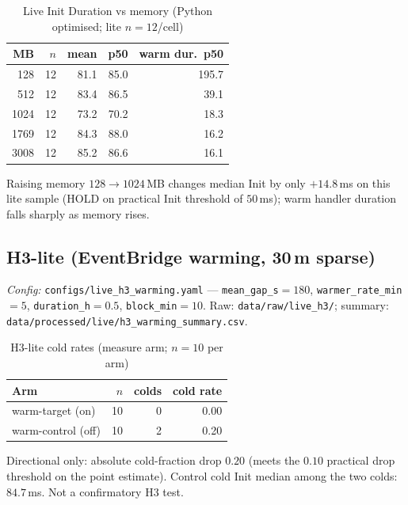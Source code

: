\begin{table}[h]
\centering
\caption{Live Init Duration vs memory (Python optimised; lite $n{=}12$/cell)}
\label{tab:eval_live_h4}
\begin{tabular}{rrrrr}
\hline
\textbf{MB} & \textbf{$n$} & \textbf{mean} & \textbf{p50} & \textbf{warm dur.\ p50} \\
\hline
128 & 12 & 81.1 & 85.0 & 195.7 \\
512 & 12 & 83.4 & 86.5 & 39.1 \\
1024 & 12 & 73.2 & 70.2 & 18.3 \\
1769 & 12 & 84.3 & 88.0 & 16.2 \\
3008 & 12 & 85.2 & 86.6 & 16.1 \\
\hline
\end{tabular}
\end{table}

Raising memory $128{\rightarrow}1024$\,MB changes median Init by only $+14.8$\,ms on this
lite sample (HOLD on practical Init threshold of $50$\,ms); warm handler duration falls
sharply as memory rises.

\subsection{H3-lite (EventBridge warming, 30\,m sparse)}

\textit{Config:} \texttt{configs/live_h3_warming.yaml} --- \texttt{mean\_gap\_s}${}={}180$,
\texttt{warmer\_rate\_min}${}={}5$, \texttt{duration\_h}${}={}0.5$, \texttt{block\_min}${}={}10$.
Raw: \texttt{data/raw/live\_h3/}; summary: \texttt{data/processed/live/h3\_warming\_summary.csv}.

\begin{table}[h]
\centering
\caption{H3-lite cold rates (measure arm; $n{=}10$ per arm)}
\label{tab:eval_live_h3}
\begin{tabular}{lrrr}
\hline
\textbf{Arm} & \textbf{$n$} & \textbf{colds} & \textbf{cold rate} \\
\hline
warm-target (on) & 10 & 0 & 0.00 \\
warm-control (off) & 10 & 2 & 0.20 \\
\hline
\end{tabular}
\end{table}

Directional only: absolute cold-fraction drop $0.20$ (meets the $0.10$ practical drop
threshold on the point estimate). Control cold Init median among the two colds:
$84.7$\,ms. Not a confirmatory H3 test.


